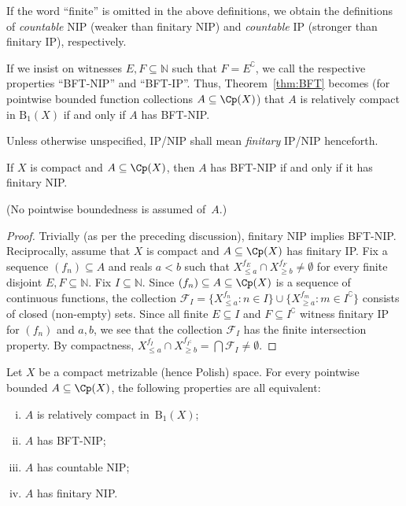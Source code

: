 If the word ``finite'' is omitted in the above definitions, we obtain the definitions of \emph{countable} NIP (weaker than finitary NIP) and \emph{countable} IP (stronger than finitary IP), respectively.

If we insist on witnesses $E,F\subseteq \mathbb{N}$ such that $F = E^{\complement}$, we call the respective properties ``BFT-NIP'' and ``BFT-IP''.
Thus, Theorem~\ref{thm:BFT} becomes (for pointwise bounded function collections $A\subseteq \Cp(X)$) that $A$ is relatively compact in $\mathrm{B}_1(X)$ if and only if $A$ has BFT-NIP.

Unless otherwise unspecified, IP/NIP shall mean \emph{finitary} IP/NIP henceforth.

\begin{proposition}\label{prop:BFT-finitary-cpct}
    If $X$ is compact and $A\subseteq \Cp(X)$, then $A$ has BFT-NIP if and only if it has finitary NIP.
\end{proposition}
(No pointwise boundedness is assumed of~$A$.)
\begin{proof}
    Trivially (as per the preceding discussion), finitary NIP implies BFT-NIP.
    Reciprocally, assume that $X$ is compact and $A\subseteq \Cp(X)$ has finitary IP.
    Fix a sequence $(f_n)\subseteq A$ and reals $a<b$ such that $X^{f_E}_{\le a}\cap X^{f_F}_{\ge b}\neq\emptyset$ for every finite disjoint $E,F\subseteq\mathbb{N}$.
    Fix $I\subseteq\mathbb{N}$.
    Since $(f_n)\subseteq A\subseteq \Cp(X)$ is a sequence of continuous functions, the collection $\mathcal{F}_I=\{X^{f_n}_{\le a}:n\in I\}\cup\{X^{f_m}_{\ge a}:m\in I^{\complement}\}$ consists of closed (non-empty) sets.
    Since all finite $E\subseteq I$ and $F\subseteq I^{\complement}$ witness finitary IP for $(f_n)$ and $a, b$, we see that the collection $\mathcal{F}_I$ has the finite intersection property.
    By compactness, $X^{f_I}_{\le a}\cap X^{f_{I^{\complement}}}_{\ge b} = \bigcap\mathcal{F}_I\neq\emptyset$.
\end{proof}

\begin{theorem}\label{thm:BFT2}
    Let $X$ be a compact metrizable (hence Polish) space.
    For every pointwise bounded $A\subseteq \Cp(X)$, the following properties are all equivalent:
    \begin{enumerate}[(i)]
        \item $A$ is relatively compact in~$\mathrm{B}_1(X)$;
        \item $A$ has BFT-NIP;
        \item $A$ has countable NIP;
        \item $A$ has finitary NIP.
    \end{enumerate}
\end{theorem}

